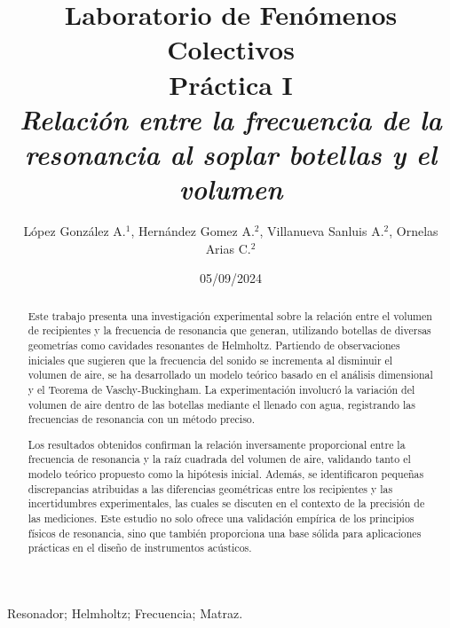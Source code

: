 \documentclass[article,12pt]{elsarticle}
\date{05/09/2024}
\begin{document}
    \begin{frontmatter}
    \title{\textbf{Laboratorio de Fenómenos Colectivos} \\  Práctica  I\\ 
        \textit{Relación entre la frecuencia de la resonancia al soplar botellas y el volumen}}
    \author{López González A.$^1$, Hernández Gomez A.$^2$, Villanueva Sanluis A.$^2$, Ornelas Arias C.$^2$}
    \address{$^1$ Facultad de Ciencias, Universidad Nacional Autónoma de México, Apartado Postal 70-399, M\'exico CDMX, 04510, México.}


    \begin{abstract}
    Este trabajo presenta una investigación experimental sobre la relación entre el volumen de recipientes y la frecuencia de resonancia que generan, utilizando botellas de diversas geometrías como cavidades resonantes de Helmholtz. Partiendo de observaciones iniciales que sugieren que la frecuencia del sonido se incrementa al disminuir el volumen de aire, se ha desarrollado un modelo teórico basado en el análisis dimensional y el Teorema de Vaschy-Buckingham. La experimentación involucró la variación del volumen de aire dentro de las botellas mediante el llenado con agua, registrando las frecuencias de resonancia con un método preciso.

Los resultados obtenidos confirman la relación inversamente proporcional entre la frecuencia de resonancia y la raíz cuadrada del volumen de aire, validando tanto el modelo teórico propuesto como la hipótesis inicial. Además, se identificaron pequeñas discrepancias atribuidas a las diferencias geométricas entre los recipientes y las incertidumbres experimentales, las cuales se discuten en el contexto de la precisión de las mediciones. Este estudio no solo ofrece una validación empírica de los principios físicos de resonancia, sino que también proporciona una base sólida para aplicaciones prácticas en el diseño de instrumentos acústicos.
    \end{abstract}

    \begin{keyword}
     Resonador; Helmholtz; Frecuencia; Matraz.
    \end{keyword}
\end{frontmatter}
\end{document}
